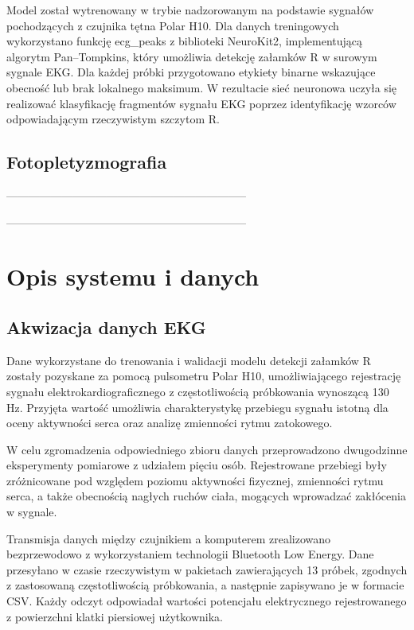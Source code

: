 \documentclass[journal]{IEEEtran}
\begin{document}
Model został wytrenowany w trybie nadzorowanym na podstawie sygnałów pochodzących z czujnika tętna Polar H10. Dla danych treningowych wykorzystano funkcję ecg\_peaks z biblioteki NeuroKit2, implementującą algorytm Pan–Tompkins, który umożliwia detekcję załamków R w surowym sygnale EKG. Dla każdej próbki przygotowano etykiety binarne wskazujące obecność lub brak lokalnego maksimum. W rezultacie sieć neuronowa uczyła się realizować klasyfikację fragmentów sygnału EKG poprzez identyfikację wzorców odpowiadającym rzeczywistym szczytom R.


\subsection{Fotopletyzmografia}
-----------------------------------------------------------------

-----------------------------------------------------------------

\newpage
\section{Opis systemu i danych}

\subsection{Akwizacja danych EKG}
Dane wykorzystane do trenowania i walidacji modelu detekcji załamków R zostały pozyskane za pomocą pulsometru Polar H10, umożliwiającego rejestrację sygnału elektrokardiograficznego z częstotliwością próbkowania wynoszącą 130 Hz. Przyjęta wartość umożliwia charakterystykę przebiegu sygnału istotną dla oceny aktywności serca oraz analizę zmienności rytmu zatokowego.

W celu zgromadzenia odpowiedniego zbioru danych przeprowadzono dwugodzinne eksperymenty pomiarowe z udziałem pięciu osób. Rejestrowane przebiegi były zróżnicowane pod względem poziomu aktywności fizycznej, zmienności rytmu serca, a także obecnością nagłych ruchów ciała, mogących wprowadzać zakłócenia w sygnale.

Transmisja danych między czujnikiem a komputerem zrealizowano bezprzewodowo z wykorzystaniem technologii Bluetooth Low Energy. Dane przesyłano w czasie rzeczywistym w pakietach zawierających 13 próbek, zgodnych z zastosowaną częstotliwością próbkowania, a następnie zapisywano je w formacie CSV. Każdy odczyt odpowiadał wartości potencjału elektrycznego rejestrowanego z powierzchni klatki piersiowej użytkownika.
\end{document}
